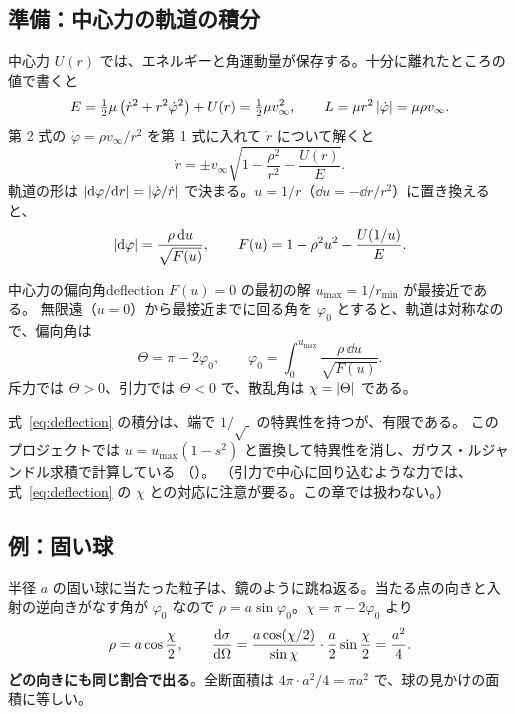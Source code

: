 \subsection{準備：中心力の軌道の積分}\label{sec:coll-orbit}

中心力 $U(r)$ では、エネルギーと角運動量が保存する。十分に離れたところの値で書くと
\begin{equation}
  E=\tfrac12\mu\left(\dot r^2+r^2\dot\varphi^2\right)+U(r)=\tfrac12\mu v_\infty^2,\qquad
  L=\mu r^2\left\lvert \dot\varphi\right\rvert=\mu\rho v_\infty .
\end{equation}
第 2 式の $\dot\varphi=\rho v_\infty/r^2$ を第 1 式に入れて $\dot r$ について解くと
\begin{equation}
  \dot r=\pm v_\infty\sqrt{1-\frac{\rho^2}{r^2}-\frac{U(r)}{E}} .
\end{equation}
軌道の形は $\left\lvert \mathrm{d}\varphi/\mathrm{d} r\right\rvert=\left\lvert \dot\varphi/\dot r\right\rvert$ で決まる。$u=1/r$（$\dd u=-\dd r/r^2$）に置き換えると、
\begin{equation}
  \left\lvert \mathrm{d}\varphi\right\rvert=\frac{\rho\,\mathrm{d} u}{\sqrt{F(u)}},\qquad
  F(u)=1-\rho^2u^2-\frac{U(1/u)}{E}.
  \label{eq:orbit-F}
\end{equation}

\begin{result}{中心力の偏向角}{deflection}
$F(u)=0$ の最初の解 $u_{\max}=1/r_{\min}$ が最接近である。
無限遠（$u=0$）から最接近までに回る角を $\varphi_0$ とすると、軌道は対称なので、偏向角は
\begin{equation}
  \Theta=\pi-2\varphi_0,\qquad\varphi_0=\int_0^{u_{\max}}\frac{\rho\,\dd u}{\sqrt{F(u)}} .
  \label{eq:deflection}
\end{equation}
斥力では $\Theta>0$、引力では $\Theta<0$ で、散乱角は $\chi=\left\lvert \Theta\right\rvert$ である。
\end{result}

式~\eqref{eq:deflection} の積分は、端で $1/\sqrt{\ }$ の特異性を持つが、有限である。
このプロジェクトでは $u=u_{\max}(1-s^2)$ と置換して特異性を消し、ガウス・ルジャンドル求積で計算している
（）。
（引力で中心に回り込むような力では、式~\eqref{eq:deflection} の $\chi$ との対応に注意が要る。この章では扱わない。）

\subsection{例：固い球}

半径 $a$ の固い球に当たった粒子は、鏡のように跳ね返る。当たる点の向きと入射の逆向きがなす角が $\varphi_0$ なので
$\rho=a\sin\varphi_0$。$\chi=\pi-2\varphi_0$ より
\begin{equation}
  \rho=a\cos\frac\chi2,\qquad
  \frac{\mathrm{d} \sigma}{\mathrm{d} \Omega}=\frac{a\cos(\chi/2)}{\sin\chi}\cdot\frac a2\sin\frac\chi2=\frac{a^2}{4}.
  \label{eq:hard-sphere}
\end{equation}
\textbf{どの向きにも同じ割合で出る}。全断面積は $4\pi\cdot a^2/4=\pi a^2$ で、球の見かけの面積に等しい。

